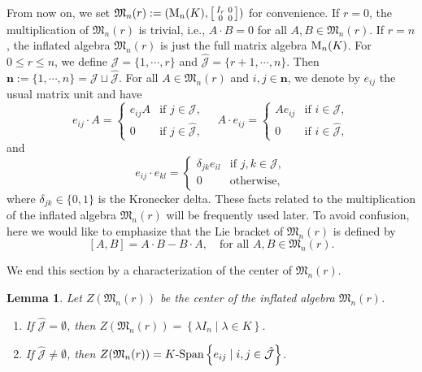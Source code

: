\documentclass[reqno]{amsart}
\theoremstyle{plain}
\newtheorem{lemma}[theorem]{Lemma}
\theoremstyle{definition}
\begin{document}
From now on, we set $\mathfrak{M}_n(r):=({\rm M}_n(K), 
\left[\smallmatrix I_{r} & 0 \\ 0 & 0 \endsmallmatrix \right] )$ for convenience. If $r=0$, the multiplication of
$\mathfrak{M}_n(r)$ is trivial, i.e., $A \cdot B=0$ for all $A, B\in \mathfrak{M}_n(r)$. If $r=n$, the inflated algebra
$\mathfrak{M}_n(r)$ is just the full matrix algebra
${\rm M}_n(K)$. For $0\leq r\leq n$, we define
$\mathcal{J}= \{ 1,\cdots,r\}$ and $\hat{\mathcal{J}} = \{r+1,\cdots,n\}$. Then $\mathbf{n}:=\{1,\cdots,n\}=\mathcal{J} \sqcup \hat{\mathcal{J}}$.
For all $A \in \mathfrak{M}_n(r)$ and $i,j \in \mathbf{n}$,
we denote by $e_{ij}$ the usual matrix unit and have
$$
e_{ij} \cdot  A = 
\begin{cases} 
e_{ij}   A & \text{if } j\in \mathcal{J}, \\
0 & \text{if } j \in \hat{\mathcal{J}},
\end{cases}  \quad 
A \cdot  e_{ij} =
\begin{cases} 
 A e_{ij}   & \text{if } i\in \mathcal{J}, \\
0 & \text{if } i \in \hat{\mathcal{J}},
\end{cases}
$$
and
\[
e_{ij} \cdot  e_{kl} = 
\begin{cases} 
\delta_{jk}e_{il} & \text{if } j, k \in \mathcal{J}, \\
0 & \text{otherwise},
\end{cases}
\]
where $\delta_{jk}\in \{0,1\}$ is the Kronecker delta. These facts related to the multiplication of the inflated algebra
$\mathfrak{M}_n(r)$ will be frequently used later.
To avoid confusion, here we would like to emphasize that
the Lie bracket of $\mathfrak{M}_n(r)$ is defined by
\[
[A, B] = A \cdot  B - B \cdot  A, \quad \text{for all } A, B \in \mathfrak{M}_n(r).
\]

We end this section by a characterization of the center of
$\mathfrak{M}_n(r)$.

\begin{lemma}\label{l1}
Let $Z(\mathfrak{M}_n(r))$ be the center of the inflated algebra $\mathfrak{M}_n(r)$.
\begin{enumerate}
 \item[(i)] If $\hat{\mathcal{J}} =\emptyset$, then $Z(\mathfrak{M}_n(r)) = \left\{ \lambda I_n \mid \lambda \in K \right\}$.
 \item[(ii)] If $\hat{\mathcal{J}} \neq \emptyset$, then $Z(\mathfrak{M}_n(r)) =K\text{-}{\rm Span} \left\{ e_{ij} \mid i, j \in \hat{\mathcal{J}} \right\}$.
\end{enumerate}
\end{lemma}
\end{document}
